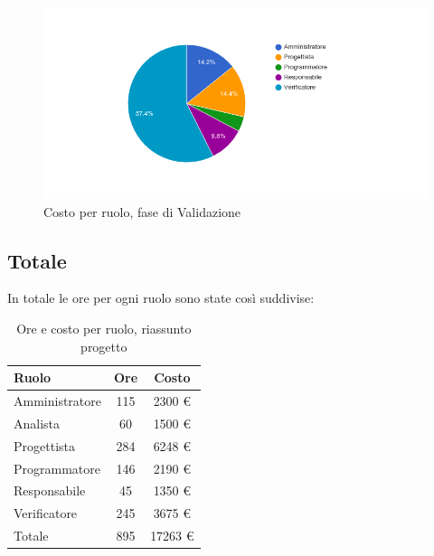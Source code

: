\begin{figure}[H]
  \begin{center}
    \includegraphics[width=15cm]{res/img/prospettoEconomico/costoPerRuoloValidazione.png}
  \caption{Costo per ruolo, fase di Validazione}
  \end{center} 
\end{figure}  


\subsection{Totale}
In totale le ore per ogni ruolo sono state così suddivise:

\begin{table}[H]
	\centering
	\begin{tabular}{ l c c }
		\textbf{Ruolo} & \textbf{Ore} & \textbf{Costo} \\
		\hline
		Amministratore & 115 & 2300 \euro{} \\
		Analista & 60 & 1500 \euro{} \\
		Progettista & 284 & 6248 \euro{} \\
		Programmatore & 146 & 2190 \euro{} \\
		Responsabile & 45 & 1350 \euro{} \\
		Verificatore & 245 & 3675 \euro{} \\
		\hline
		Totale & 895 & 17263 \euro{} \\
		\hline
	\end{tabular}
	\caption{Ore e costo per ruolo, riassunto progetto}
\end{table}

